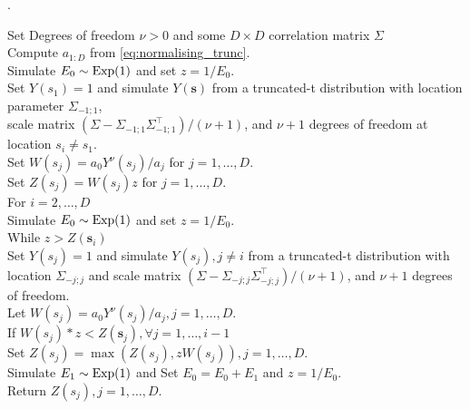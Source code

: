 \documentclass[12pt]{article}
\begin{document}
\begin{algorithm}
\caption{Exact simulation of truncated extremal-t processes at locations $\bm s = (s_1,\dots,s_D)$}.
\label{algo:trunc_extremal_t}
\begin{tabbing}
    \qquad \enspace Set Degrees of freedom $\nu>0$ and some $D\times D$ correlation matrix $\Sigma$ \\
    \qquad \enspace Compute $a_{1:D}$ from  \eqref{eq:normalising_trunc}. \\
    \qquad \enspace Simulate $E_0 \sim \rm{Exp}(1)$ and set $z=1/E_0$. \\    
    \qquad \enspace Set $Y(s_1)=1$ and simulate $Y(\bm s)$ from a truncated-t distribution with location parameter $\Sigma_{-1;1}$,\\ 
    \qquad \enspace scale matrix $(\Sigma - \Sigma_{-1;1}\Sigma_{-1;1}^\top)/(\nu+1)$, and $\nu+1$ degrees of freedom at location $s_i\neq s_1$. \\
    \qquad \enspace Set $W(s_j) = a_0 Y^{\nu}(s_j)/a_j$ for $j=1,\dots,D$. \\
    \qquad \enspace Set $Z(s_j)=W(s_j)z$ for $j=1,\dots,D$. \\
    \qquad \enspace For {$i=2,\dots,D$} \\
    \qquad \qquad \enspace Simulate $E_0 \sim \rm{Exp}(1)$ and set $z=1/E_0$. \\
    \qquad \qquad \enspace While {$z > Z(\bm s_i)$} \\
    \qquad \qquad \qquad \enspace Set $Y(s_j)=1$ and simulate $Y(s_j),j\neq i$ from a truncated-t distribution with \\
    \qquad \qquad \qquad \enspace location $\Sigma_{-j;j}$ and scale matrix $(\Sigma - \Sigma_{-j;j}\Sigma_{-j;j}^\top)/(\nu+1)$, and $\nu+1$ degrees of freedom. \\
    \qquad \qquad \qquad \enspace Let $W(s_j) = a_0Y^{\nu}(s_j)/a_j,j=1,\dots,D$. \\
    \qquad \qquad \qquad \enspace If {$W(s_{j})*z < Z(\bm s_j), \forall j=1,\dots,i-1$} \\
    \qquad \qquad \qquad \qquad \enspace Set $Z(s_j)=\max(Z(s_j),zW(s_j)),j=1,\dots,D$. \\
    \qquad \qquad \qquad \enspace Simulate $E_1 \sim \rm{Exp}(1)$ and Set $E_0 = E_0 + E_1$ and $z=1/E_0$.\\
    \qquad \enspace Return $Z(s_j ),j=1,\dots,D$.
\end{tabbing}
\end{algorithm}
\end{document}
